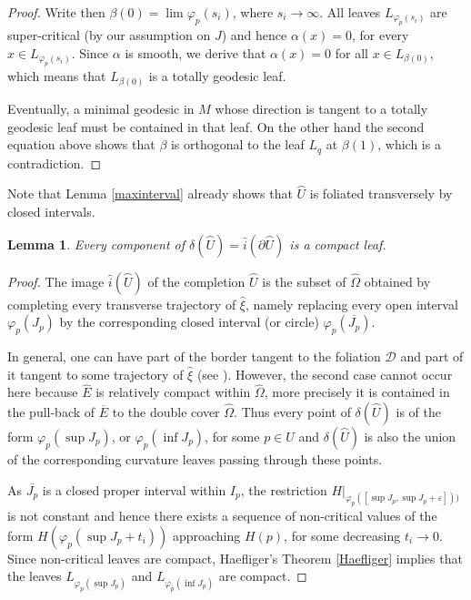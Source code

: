 \documentclass[10pt]{amsart}
\let\mathcal\mathscr
\newtheorem{lemma}[theorem]{Lemma}
\theoremstyle{definition}
\theoremstyle{remark}
\numberwithin{equation}{section}
\begin{document}
\begin{proof}
Write then $\beta(0)=\lim \varphi_p(s_i)$, where $s_i\to \infty$.
All leaves $L_{\varphi_p(s_i)}$ are super-critical (by our assumption on $J$) and hence
$\alpha(x)=0$, for every $x\in L_{\varphi_p(s_i)}$. Since $\alpha$ is smooth, we derive that
$\alpha(x)=0$ for all $x\in L_{\beta(0)}$, which means that $L_{\beta(0)}$ is a totally geodesic leaf.

Eventually, a minimal geodesic in $M$ whose direction is tangent to a totally geodesic
leaf must be contained in that leaf. On the other hand the second equation
above shows that $\beta$ is orthogonal to the leaf $L_q$ at $\beta(1)$, which is
a contradiction.
\end{proof}

Note that Lemma \ref{maxinterval} already shows that $\wideparen{U}$ is foliated transversely by closed intervals.

\begin{lemma}\label{border}
Every component of $\delta(\wideparen{U})=\wideparen{i}(\partial \wideparen{U})$ is a compact leaf.
\end{lemma}
\begin{proof}
The image $\wideparen{i}(\wideparen{U})$ of the completion $\wideparen{U}$ is the subset of $\widehat{\Omega}$ obtained
by completing every transverse trajectory of $\widehat{\xi}$, namely replacing every open interval $\varphi_p(J_p)$ by the corresponding closed
interval (or circle) $\varphi_p(\overline{J_p})$.

In general, one can have part of the border tangent to the foliation $\mathcal D$ and part of it
tangent to some trajectory of $\widehat{\xi}$ (see \cite[\S4]{CaC}). However, the second case cannot occur here
because $\widehat{E}$ is relatively compact within $\widehat{\Omega}$, more precisely it is
contained in the pull-back of $\overline{E}$ to the double cover $\widehat{\Omega}$.
Thus every point of $\delta(\wideparen{U})$ is of the form $\varphi_p(\sup J_p)$, or $\varphi_p(\inf J_p)$, for some $p\in U$ and
$\delta(\wideparen{U})$ is also the union of the corresponding curvature leaves passing through these points.

As $\overline{J_p}$ is a closed proper interval within $I_p$, the restriction $H|_{\varphi_p([\sup J_p, \sup J_p+\varepsilon]))}$
is not constant and hence there exists a sequence of
non-critical values of the form $H(\varphi_p(\sup J_p+t_i))$ approaching $H(p)$,
for some decreasing $t_i\to 0$.
Since non-critical leaves are compact, Haefliger's Theorem \ref{Haefliger} implies
that the leaves $L_{\varphi_p(\sup J_p)}$ and $L_{\varphi_p(\inf J_p)}$ are compact.
\end{proof}
\end{document}
